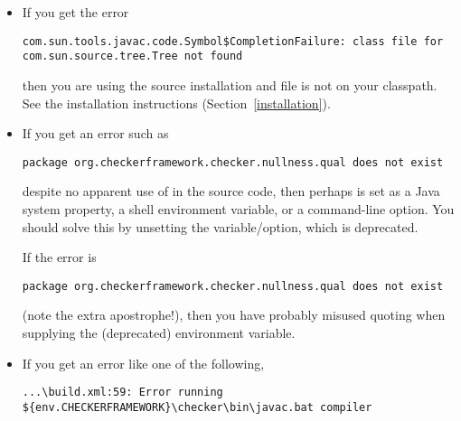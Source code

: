 \begin{itemize}
\item
If you get the error

\begin{smaller}
\begin{Verbatim}
com.sun.tools.javac.code.Symbol$CompletionFailure: class file for com.sun.source.tree.Tree not found
\end{Verbatim}
\end{smaller}

\noindent
then you are using the source installation and file  is not
on your classpath.  See the installation instructions
(Section~\ref{installation}).

\item
If you get an error such as

\begin{Verbatim}
package org.checkerframework.checker.nullness.qual does not exist
\end{Verbatim}

  \noindent
\begin{sloppypar}
  despite no apparent use of  in
  the source code, then perhaps
   is set as a Java system property, a shell
  environment variable, or a command-line option.
  You should solve this by unsetting the variable/option, which is deprecated.
\end{sloppypar}

If the error is

\begin{Verbatim}
package org.checkerframework.checker.nullness.qual does not exist
\end{Verbatim}

\begin{sloppypar}
\noindent
(note the extra apostrophe!), then you have probably misused quoting when
supplying the (deprecated)  environment variable.
\end{sloppypar}

\item
If you get an error like one of the following,

\begin{smaller}
\begin{Verbatim}
...\build.xml:59: Error running ${env.CHECKERFRAMEWORK}\checker\bin\javac.bat compiler
\end{Verbatim}


\end{smaller}
\end{itemize}
